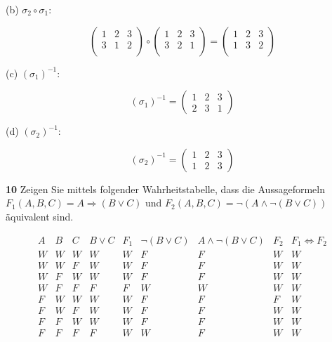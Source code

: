 \documentclass[11pt]{article}
\begin{document}
(b) \(\sigma_{2} \circ \sigma_{1}\):

    \[
        \begin{pmatrix}
            1 & 2 & 3 \\
            3 & 1 & 2 \\
        \end{pmatrix}
        \circ
        \begin{pmatrix}
            1 & 2 & 3 \\
            3 & 2 & 1 \\
        \end{pmatrix}
        =
        \begin{pmatrix}
            1 & 2 & 3 \\
            1 & 3 & 2 \\
        \end{pmatrix}
    \]

(c) \((\sigma_{1})^{-1}\):

\[
    (\sigma_{1})^{-1} = \begin{pmatrix} 1 & 2 & 3 \\ 2 & 3 & 1 \end{pmatrix}
\]

(d) \((\sigma_{2})^{-1}\):

\[
    (\sigma_{2})^{-1} = \begin{pmatrix} 1 & 2 & 3 \\ 1 & 2 & 3 \end{pmatrix}
\]


\textbf{10} Zeigen Sie mittels folgender Wahrheitstabelle, dass die Aussageformeln \(F_1(A,B,C) = A \Rightarrow (B \lor C)\) und \(F_2(A,B,C) = \neg(A \land \neg(B \lor C))\) äquivalent sind.

\[
    \begin{array}{ccc|c|c|c|c|c|c}
        A & B & C & B \lor C & F_1 & \neg(B \lor C) & A \land \neg(B \lor C) & F_2 & F_1 \Leftrightarrow F_2 \\
        \hline
        W & W & W & W & W & F & F & W & W \\
        W & W & F & W & W & F & F & W & W \\
        W & F & W & W & W & F & F & W & W \\
        W & F & F & F & F & W & W & W & W \\
        F & W & W & W & W & F & F & F & W \\
        F & W & F & W & W & F & F & W & W \\
        F & F & W & W & W & F & F & W & W \\
        F & F & F & F & W & W & F & W & W \\
    \end{array}
\]
\end{document}
